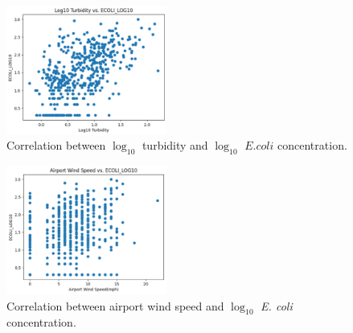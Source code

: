 \begin{figure}
    \centering
    \includegraphics[width=0.47\textwidth]{figs/log10_turb_ecoli.png}
    \caption{Correlation between $\log_{10}$ turbidity and $\log_{10}$ $E. coli$ concentration.}
    \label{fig:turbecoli}
\end{figure}
\begin{figure}
    \centering
    \includegraphics[width=0.47\textwidth]{figs/airportwindsp.png}
    \caption{Correlation between airport wind speed and $\log_{10}$ \textit{E. coli} concentration.}
    \label{fig:airportwindsp}
\end{figure}
